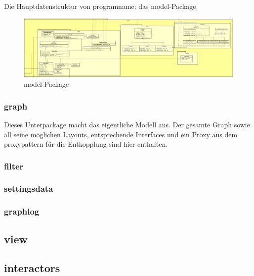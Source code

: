 Die Hauptdatenstruktur von \gls{programname}: das model-Package.

\begin{figure}[H]
  \centering
  \includegraphics[width=\textwidth]{../diagramimages/model.png}
  \caption{model-Package}
\end{figure}

    \subsubsection{graph}
    Dieses Unterpackage macht das eigentliche Modell aus. Der gesamte Graph sowie all seine möglichen Layouts, entsprechende Interfaces und ein Proxy aus dem \gls{proxypattern} für die Entkopplung sind hier enthalten.
    \subsubsection{filter}

    \subsubsection{settingsdata}

    \subsubsection{graphlog}


\subsection{view}
\label{subsec:view}

\subsection{interactors}
\label{subsec:interactors}
